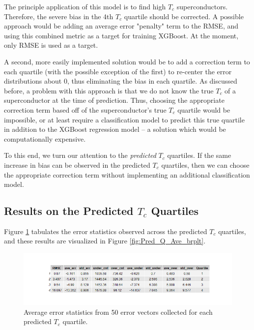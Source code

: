 \documentclass[oneside,12pt]{amsart}
\begin{document}
The principle application of this model is to find high $T_c$ superconductors. Therefore, the severe bias in the 4th $T_c$ quartile should be corrected. A possible approach would be adding an average error "penalty" term to the RMSE, and using this combined metric as a target for training XGBoost. At the moment, only RMSE is used as a target.

A second, more easily implemented solution would be to add a correction term to each quartile (with the possible exception of the first) to re-center the error distributions about 0, thus eliminating the bias in each quartile. As discussed before, a problem with this approach is that we do not know the true $T_c$ of a superconductor at the time of prediction. Thus, choosing the appropriate correction term based off of the superconductor's true $T_c$ quartile would be impossible, or at least require a classification model to predict this true quartile in addition to the XGBoost regression model -- a solution which would be computationally expensive.
  
To this end, we turn our attention to the \textit{predicted} $T_c$ quartiles. If the same increase in bias can be observed in the predicted $T_c$ quartiles, then we can choose the appropriate correction term without implementing an additional classification model.

\subsection{Results on the Predicted $T_c$ Quartiles}
Figure \ref{fig:quart_pred_ave_tbl} tabulates the error statistics observed across the predicted $T_c$ quartiles, and these results are visualized in Figure \ref{fig:Pred_Q_Ave_brplt}.
\begin{figure}
    \centering
    \includegraphics[width=\linewidth]{quart_pred_ave_tbl.png}
    \caption{Average error statistics from 50 error vectors collected for each predicted $T_c$ quartile.}
    \label{fig:quart_pred_ave_tbl}
\end{figure}
\end{document}
